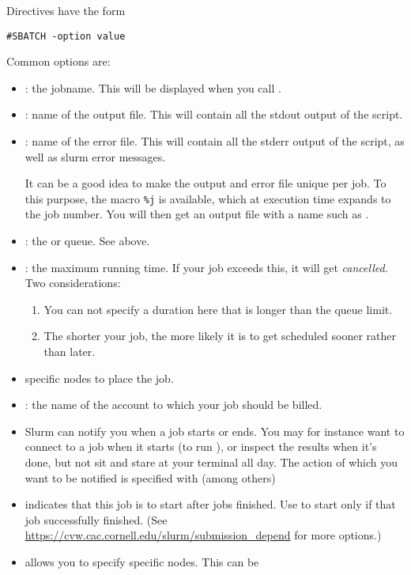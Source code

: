 Directives have the form
\begin{verbatim}
#SBATCH -option value
\end{verbatim}
Common options are:
\begin{itemize}
\item {}: the jobname. This will be displayed when you call .
\item {}: name of the output file. This will contain all the stdout output of the script.
\item {}: name of the error file. This will contain all the stderr
  output of the script, as well as slurm error messages.

  It can be a good idea to make the output and error file unique per job.
  To this purpose, the macro \verb+%j+ is available, which at execution time
  expands to the job number. You will then get an output file with a
  name such as .
\item {}: the  or queue. See above.
\item {}: the maximum running time.
  If your job exceeds this, it will get
  \emph{cancelled}. Two considerations:
  \begin{enumerate}
  \item You can not specify a duration here that is longer than the queue limit.
  \item The shorter your job, the more likely it is to get scheduled sooner
    rather than later.
  \end{enumerate}
\item {} specific nodes to place the job.
\item {}: the name of the account to which your job should be billed.
\item {} Slurm can notify you when a job starts or ends.
  You may for instance want to connect to a job when it starts
  (to run ),
  or inspect the results when it's done, but not sit and stare at your terminal all day.
  The action of which you want to be notified is specified with
  (among others)
\item {} indicates that this job is to
  start after jobs  finished. Use  to start only
  if that job successfully finished. (See
  \url{https://cvw.cac.cornell.edu/slurm/submission_depend} for more
  options.)
\item {} allows you to specify specific nodes. This can be

\end{itemize}
